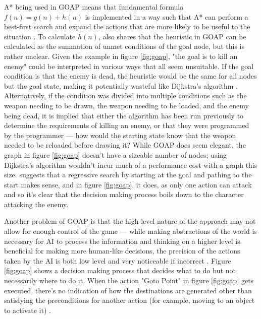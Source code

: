 \documentclass[11pt, a4paper]{article}
\begin{document}
A* being used in GOAP means that fundamental formula $f(n) = g(n) + h(n)$ \parencite[102]{hart1968formal} is implemented in a way such that A* can perform a best-first search and expand the actions that are more likely to be  useful to the situation \parencite[7]{orkin2003applying}. To calculate $h(n)$, \citeauthor{orkin2003applying} \parencite*[7]{orkin2003applying} also shares that the heuristic in GOAP can be calculated as the summation of unmet conditions of the goal node, but this is rather unclear. Given the example in figure \ref{fig:goap}, "the goal is to kill an enemy" \parencite[3]{orkin2003applying} could be interpreted in various ways that all seem unsuitable. If the goal condition is that the enemy is dead, the heuristic would be the same for all nodes but the goal state, making it potentially wasteful like Dijkstra's algorithm \parencite[214]{millington2019ai}. Alternatively, if the condition was divided into multiple conditions such as the weapon needing to be drawn, the weapon needing to be loaded, and the enemy being dead, it is implied that either the algorithm has been run previously to determine the requirements of killing an enemy, or that they were programmed by the programmer --- how would the starting state know that the weapon needed to be reloaded before drawing it? While GOAP does seem elegant, the graph in figure \ref{fig:goap} doesn't have a sizeable number of nodes; using Dijkstra's algorithm wouldn't incur much of a performance cost with a graph this size. \citeauthor{orkin2003applying} \parencite*{orkin2003applying} suggests that a regressive search by starting at the goal and pathing to the start makes sense, and in figure \ref{fig:goap}, it does, as only one action can attack and so it's clear that the decision making process boils down to the character attacking the enemy.

Another problem of GOAP is that the high-level nature of the approach may not allow for enough control of the game \parencite[87]{stanciu2012implementing} --- while making abstractions of the world is necessary for AI to process the information \parencite[2]{buro2004call} and thinking on a higher level is beneficial for making more human-like decisions, the precision of the actions taken by the AI is both low level and very noticeable if incorrect \parencite[60]{graham2003pathfinding}. Figure \ref{fig:goap} shows a decision making process that decides what to do but not necessarily where to do it. When the action "Goto Point" in figure \ref{fig:goap} gets executed, there's no indication of how the destinations are generated other than satisfying the preconditions for another action (for example, moving to an object to activate it) \parencite[7]{orkin2003applying}. 
\end{document}
